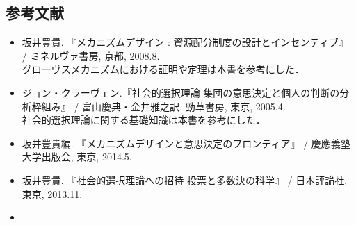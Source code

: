 \documentclass[a4paper, 11pt]{jsarticle}
\begin{document}
\subsection*{参考文献}
\begin{itemize}[leftmargin=*]
\item 坂井豊貴. 『メカニズムデザイン : 資源配分制度の設計とインセンティブ』 / ミネルヴァ書房, 京都, 2008.8.\\グローヴスメカニズムにおける証明や定理は本書を参考にした．
\item ジョン・クラーヴェン.『社会的選択理論 集団の意思決定と個人の判断の分析枠組み』 / 富山慶典・金井雅之訳. 勁草書房, 東京, 2005.4.\\社会的選択理論に関する基礎知識は本書を参考にした．
\item 坂井豊貴編. 『メカニズムデザインと意思決定のフロンティア』 / 慶應義塾大学出版会, 東京, 2014.5.
\item 坂井豊貴. 『社会的選択理論への招待 投票と多数決の科学』 / 日本評論社, 東京, 2013.11.
\item 
\end{itemize}
\end{document}
